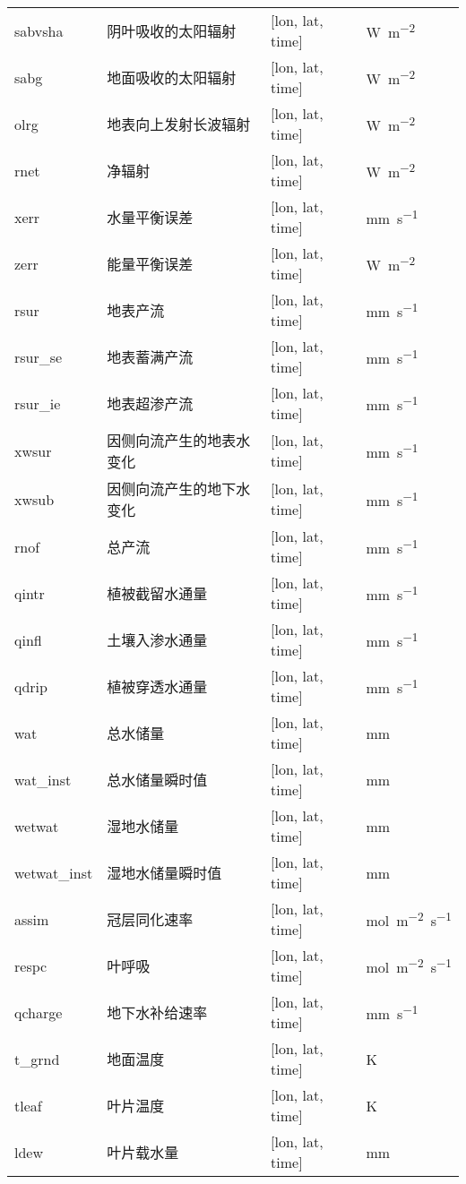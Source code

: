 {\begin{longtable}[htbp]{lp{}p{}l}
sabvsha & 阴叶吸收的太阳辐射 & {[}lon, lat, time{]}  & \unit{W.m^{-2}} \\
sabg & 地面吸收的太阳辐射 & {[}lon, lat, time{]}  & \unit{W.m^{-2}} \\
olrg & 地表向上发射长波辐射 & {[}lon, lat, time{]}  & \unit{W.m^{-2}} \\
rnet & 净辐射 & {[}lon, lat, time{]}  & \unit{W.m^{-2}} \\
xerr & 水量平衡误差 & {[}lon, lat, time{]}  & \unit{mm.s^{-1}} \\
zerr & 能量平衡误差 & {[}lon, lat, time{]}  & \unit{W.m^{-2}} \\
rsur & 地表产流 & {[}lon, lat, time{]}  & \unit{mm.s^{-1}} \\
rsur\_se & 地表蓄满产流 & {[}lon, lat, time{]}  & \unit{mm.s^{-1}} \\
rsur\_ie & 地表超渗产流 & {[}lon, lat, time{]}  & \unit{mm.s^{-1}} \\
xwsur & 因侧向流产生的地表水变化 & {[}lon, lat, time{]}  & \unit{mm.s^{-1}} \\
xwsub & 因侧向流产生的地下水变化 & {[}lon, lat, time{]}  & \unit{mm.s^{-1}} \\
rnof & 总产流 & {[}lon, lat, time{]}  & \unit{mm.s^{-1}} \\
qintr & 植被截留水通量 & {[}lon, lat, time{]}  & \unit{mm.s^{-1}} \\
qinfl & 土壤入渗水通量 & {[}lon, lat, time{]}  & \unit{mm.s^{-1}} \\
qdrip & 植被穿透水通量 & {[}lon, lat, time{]}  & \unit{mm.s^{-1}} \\
wat & 总水储量 & {[}lon, lat, time{]}  & mm \\
wat\_inst & 总水储量瞬时值 & {[}lon, lat, time{]}  & mm \\
wetwat & 湿地水储量 & {[}lon, lat, time{]}  & mm \\
wetwat\_inst & 湿地水储量瞬时值 & {[}lon, lat, time{]}  & mm \\
assim & 冠层同化速率 & {[}lon, lat, time{]}  & \unit{mol.m^{-2}.s^{-1}} \\
respc & 叶呼吸 & {[}lon, lat, time{]}  & \unit{mol.m^{-2}.s^{-1}} \\
qcharge & 地下水补给速率 & {[}lon, lat, time{]}  & \unit{mm.s^{-1}} \\
t\_grnd & 地面温度 & {[}lon, lat, time{]}  & K \\
tleaf & 叶片温度 & {[}lon, lat, time{]}  & K \\
ldew & 叶片载水量 & {[}lon, lat, time{]}  & mm \\

\end{longtable}}
